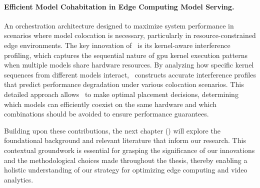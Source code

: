 \paragraph{Efficient Model Cohabitation in Edge Computing Model Serving.} An orchestration architecture designed to maximize system performance in scenarios where model colocation is necessary, particularly in resource-constrained edge environments. The key innovation of~\roomie{} is its kernel-aware interference profiling, which captures the sequential nature of \acrshort{gpu} kernel execution patterns when multiple models share hardware resources. By analyzing how specific kernel sequences from different models interact,~\roomie{} constructs accurate interference profiles that predict performance degradation under various colocation scenarios. This detailed approach allows~\roomie{} to make optimal placement decisions, determining which models can efficiently coexist on the same hardware and which combinations should be avoided to ensure performance guarantees.

Building upon these contributions, the next chapter () will explore the foundational background and relevant literature that inform our research. This contextual groundwork is essential for grasping the significance of our innovations and the methodological choices made throughout the thesis, thereby enabling a holistic understanding of our strategy for optimizing edge computing and video analytics.